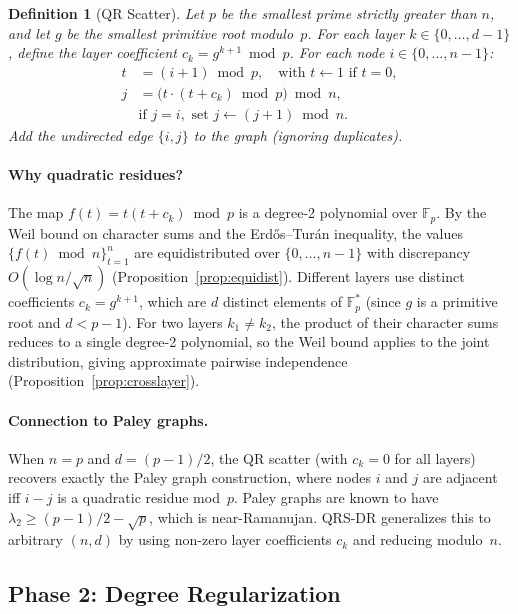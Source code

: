 \documentclass{article}
\newtheorem{definition}[theorem]{Definition}
\newcommand{\lam}{\lambda_2}
\begin{document}
\begin{definition}[QR Scatter]
\label{def:qrscatter}
Let $p$ be the smallest prime strictly greater than $n$, and let
$g$ be the smallest primitive root modulo~$p$.  For each layer
$k \in \{0, \ldots, d-1\}$, define the \emph{layer coefficient}
$c_k = g^{k+1} \bmod p$.  For each node $i \in \{0, \ldots, n-1\}$:
\begin{align}
t &= (i + 1) \bmod p, \quad\text{with } t \gets 1 \text{ if } t = 0,
\label{eq:qr_t} \\
j &= \bigl(t \cdot (t + c_k) \bmod p\bigr) \bmod n,
\label{eq:qr_target} \\
&\text{if } j = i, \text{ set } j \gets (j + 1) \bmod n.
\label{eq:qr_selfloop}
\end{align}
Add the undirected edge $\{i, j\}$ to the graph (ignoring duplicates).
\end{definition}

\paragraph{Why quadratic residues?}
The map $f(t) = t(t + c_k) \bmod p$ is a degree-2 polynomial over
$\mathbb{F}_p$.  By the Weil bound on character sums and the
Erd\H{o}s--Tur\'an inequality, the values
$\{f(t) \bmod n\}_{t=1}^{n}$ are equidistributed over
$\{0,\ldots,n-1\}$ with discrepancy $O(\log n / \sqrt{n})$
(Proposition~\ref{prop:equidist}).
Different layers use distinct coefficients
$c_k = g^{k+1}$, which are $d$ distinct elements of $\mathbb{F}_p^*$
(since $g$ is a primitive root and $d < p-1$).  For two layers
$k_1 \ne k_2$, the product of their character sums reduces to a
single degree-2 polynomial, so the Weil bound applies to the joint
distribution, giving approximate pairwise independence
(Proposition~\ref{prop:crosslayer}).

\paragraph{Connection to Paley graphs.}
When $n = p$ and $d = (p-1)/2$, the QR scatter (with $c_k = 0$ for all
layers) recovers exactly the Paley graph construction, where nodes $i$
and $j$ are adjacent iff $i - j$ is a quadratic residue mod~$p$.
Paley graphs are known to have $\lam \ge (p-1)/2 - \sqrt{p}$, which is
near-Ramanujan.  QRS-DR generalizes this to arbitrary $(n, d)$ by using
non-zero layer coefficients $c_k$ and reducing modulo~$n$.


\subsection{Phase 2: Degree Regularization}
\label{sec:regularization}
\end{document}
